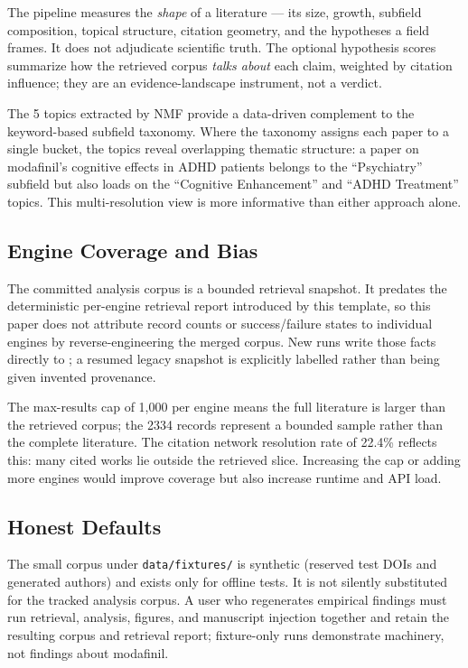 \documentclass[
  english,
]{article}
\begin{document}
The pipeline measures the \emph{shape} of a literature --- its size,
growth, subfield composition, topical structure, citation geometry, and
the hypotheses a field frames. It does not adjudicate scientific truth.
The optional hypothesis scores summarize how the retrieved corpus
\emph{talks about} each claim, weighted by citation influence; they are
an evidence-landscape instrument, not a verdict.

The 5 topics extracted by NMF provide a data-driven complement to the
keyword-based subfield taxonomy. Where the taxonomy assigns each paper
to a single bucket, the topics reveal overlapping thematic structure: a
paper on modafinil's cognitive effects in ADHD patients belongs to the
``Psychiatry'' subfield but also loads on the ``Cognitive Enhancement''
and ``ADHD Treatment'' topics. This multi-resolution view is more
informative than either approach alone.

\subsection{Engine Coverage and Bias}\label{engine-coverage-and-bias}

The committed analysis corpus is a bounded retrieval snapshot. It
predates the deterministic per-engine retrieval report introduced by
this template, so this paper does not attribute record counts or
success/failure states to individual engines by reverse-engineering the
merged corpus. New runs write those facts directly to
; a resumed legacy snapshot
is explicitly labelled
 rather than being
given invented provenance.

The max-results cap of 1,000 per engine means the full literature is
larger than the retrieved corpus; the 2334 records represent a bounded
sample rather than the complete literature. The citation network
resolution rate of 22.4\% reflects this: many cited works lie outside
the retrieved slice. Increasing the cap or adding more engines would
improve coverage but also increase runtime and API load.

\subsection{Honest Defaults}\label{honest-defaults}

The small corpus under \texttt{data/fixtures/} is synthetic (reserved
test DOIs and generated authors) and exists only for offline tests. It
is not silently substituted for the tracked analysis corpus. A user who
regenerates empirical findings must run retrieval, analysis, figures,
and manuscript injection together and retain the resulting corpus and
retrieval report; fixture-only runs demonstrate machinery, not findings
about modafinil.
\end{document}
